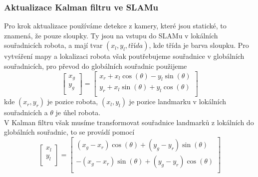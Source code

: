 \documentclass[a4paper,12pt]{article}
\begin{document}
\subsubsection{Aktualizace Kalman filtru ve SLAMu}
Pro krok aktualizace používáme detekce z kamery, které jsou statické, to znamená, že pouze sloupky. 
Ty jsou na vstupu do SLAMu v lokálních souřadnicích robota, a mají tvar $(x_l, y_l, třída)$, kde třída je barva sloupku.
Pro vytváření mapy a lokalizaci robota však poutřebujeme souřadnice v globálních souřadnicích, pro převod do globálních souřadnic použijeme
\begin{equation}
    \begin{bmatrix}
        x_g \\
        y_g \\
    \end{bmatrix} = 
    \begin{bmatrix}
        x_r + x_l \cos(\theta) - y_l \sin(\theta) \\
        y_r + x_l \sin(\theta) + y_l \cos(\theta) \\
    \end{bmatrix}
    \label{eq:local_to_global}
\end{equation}
kde $(x_r,y_r)$ je pozice robota, $(x_l,y_l)$ je pozice landmarku v lokálních souřadnicích a $\theta$ je úhel robota. \\
V Kalman filtru však musíme transformovat souřadnice landmarků z lokálních do globálních souřadnic, to se provádí pomocí 
\begin{equation}
    \begin{bmatrix}
        x_l \\
        y_l \\
    \end{bmatrix} =
    \begin{bmatrix}
        (x_g - x_r) \cos(\theta) + (y_g - y_r) \sin(\theta) \\
        - (x_g - x_r) \sin(\theta) + (y_g - y_r) \cos(\theta) \\
    \end{bmatrix}
    \label{eq:global_to_local}
\end{equation}
\end{document}

